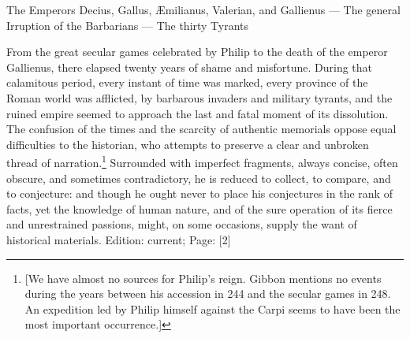 

The Emperors Decius, Gallus, Æmilianus, Valerian, and Gallienus \texthebrew{—} The general Irruption of the Barbarians \texthebrew{—} The thirty Tyrants

From the great secular games celebrated by Philip to the death of the emperor Gallienus, there elapsed twenty years of shame and misfortune. During that calamitous period, every instant of time was marked, every province of the Roman world was afflicted, by barbarous invaders and military tyrants, and the ruined empire seemed to approach the last and fatal moment of its dissolution. The confusion of the times and the scarcity of authentic memorials oppose equal difficulties to the historian, who attempts to preserve a clear and unbroken thread of narration.\footnote{[We have almost no sources for Philip\texthebrew{}’s reign. Gibbon mentions no events during the years between his accession in 244 and the secular games in 248. An expedition led by Philip himself against the Carpi seems to have been the most important occurrence.]} Surrounded with imperfect fragments, always concise, often obscure, and sometimes contradictory, he is reduced to collect, to compare, and to conjecture: and though he ought never to place his conjectures in the rank of facts, yet the knowledge of human nature, and of the sure operation of its fierce and unrestrained passions, might, on some occasions, supply the want of historical materials.
Edition: current; Page: [2]

